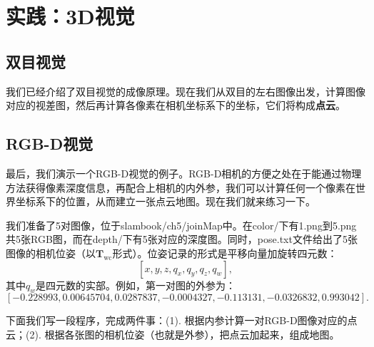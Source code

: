 \section{实践：3D视觉}
\subsection{双目视觉}
我们已经介绍了双目视觉的成像原理。现在我们从双目的左右图像出发，计算图像对应的视差图，然后再计算各像素在相机坐标系下的坐标，它们将构成\textbf{点云}。

\subsection{RGB-D视觉}
\label{sec:join-point-cloud}
最后，我们演示一个RGB-D视觉的例子。RGB-D相机的方便之处在于能通过物理方法获得像素深度信息，再配合上相机的内外参，我们可以计算任何一个像素在世界坐标系下的位置，从而建立一张点云地图。现在我们就来练习一下。

我们准备了5对图像，位于slambook/ch5/joinMap中。在color/下有1.png到5.png共5张RGB图，而在depth/下有5张对应的深度图。同时，pose.txt文件给出了5张图像的相机位姿（以$\bm{T}_\mathrm{wc}$形式）。位姿记录的形式是平移向量加旋转四元数：
\[
[x,y,z,q_x,q_y,q_z, q_w],
\]
其中$q_w$是四元数的实部。例如，第一对图的外参为：
\[
[-0.228993, 0.00645704, 0.0287837, -0.0004327, -0.113131, -0.0326832, 0.993042].
\]

下面我们写一段程序，完成两件事：(1). 根据内参计算一对RGB-D图像对应的点云；(2). 根据各张图的相机位姿（也就是外参），把点云加起来，组成地图。

